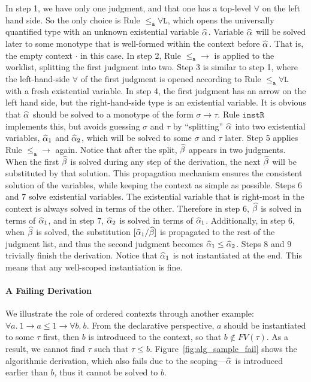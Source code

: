 In step 1, we have only one judgment, and that one has a top-level $\forall$ on
the left hand side. So the only choice is Rule $\mathtt{{\le_a}\forall L}$, which
opens the universally quantified type with an unknown existential variable
$\al$. Variable $\al$ will be solved later to some monotype that is well-formed
within the context before $\al$. That is, the empty context $\cdot$ in this
case.
In step 2, Rule $\mathtt{{\le_a}{\to}}$ is applied to the worklist,
splitting the first judgment into two.
Step 3 is similar to step 1, where the left-hand-side $\forall$ of the first
judgment is opened according to Rule $\mathtt{{\le_a}\forall L}$ with a fresh
existential variable.
In step 4, the first judgment has an arrow on the left hand side, but the
right-hand-side type is an existential variable. It is obvious
that $\al$ should be solved to a monotype of the form
$\sigma \to \tau$. Rule $\mathtt{instR}$ implements this, but avoids
guessing $\sigma$ and $\tau$ by ``splitting'' $\al$ into two existential
variables, $\al[1]$ and $\al[2]$, which will be solved to some $\sigma$ and
$\tau$ later.
Step 5 applies Rule $\mathtt{{\le_a}{\to}}$ again. Notice that after the
split, $\bt$ appears in two judgments. When the first $\bt$ is solved
during any step of the derivation, the next $\bt$ will be substituted by that
solution.  This propagation mechanism ensures the consistent solution of the
variables, while keeping the context as simple as possible.
Steps 6 and 7 solve existential variables. The existential
variable that is right-most in the context is always solved in terms of the other. Therefore in step 6,
$\bt$ is solved in terms of $\al[1]$, and in step 7, $\al[2]$ is solved in terms of $\al[1]$.
Additionally, in step 6, when $\bt$ is solved, the substitution $[\al[1] /
\bt]$ is propagated to the rest of the judgment list, and thus the second
judgment becomes $\al[1]\le\al[2]$.
Steps 8 and 9 trivially finish the derivation. Notice that $\al[1]$ is not
instantiated at the end. This means that any well-scoped instantiation is fine.

\paragraph{A Failing Derivation} We illustrate the role of ordered contexts through another example: $\forall a.\ 1\to a \le 1\to \forall b.\ b$. From the declarative perspective, $a$ should be instantiated to some $\tau$ first, then $b$ is introduced to the context, so that $b\notin FV(\tau)$. As a result, we cannot find $\tau$ such that $\tau \le b$. Figure~\ref{fig:alg_sample_fail} shows the algorithmic derivation, which also fails due to the scoping---$\al$ is introduced earlier than $b$, thus it cannot be solved to $b$.





